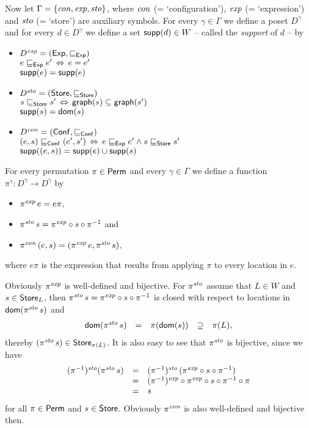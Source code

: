 \documentclass[12pt,a4paper]{report}
\newcommand{\Conf}{\sstyle{Conf}}
\newcommand{\scon}{\nstyle{con}}
\newcommand{\sexp}{\nstyle{exp}}
\newcommand{\ssto}{\nstyle{sto}}
\begin{document}
Now let $\Gamma = \{\scon,\sexp,\ssto\}$, where $\scon$ (= `configuration'),
$\sexp$ (= `expression') and $\ssto$ (= `store') are auxiliary symbols. For
every $\gamma \in \Gamma$ we define a poset $D^\gamma$ and for every $d \in D^\gamma$
we define a set $\mathsf{supp}(d) \in W$ -- called the {\em support} of $d$ -- by
\begin{itemize}
  \item $D^\sexp = (\Exp,\sqsubseteq_\Exp)$ \\
        $e \sqsubseteq_{\mathsf{Exp}} e' \,\Leftrightarrow\, e = e'$ \\
        $\mathsf{supp}(e) = \mathsf{supp}(e)$
  \item $D^\ssto = (\Store,\sqsubseteq_\Store)$ \\
        $s \sqsubseteq_{\mathsf{Store}} s' \,\Leftrightarrow\, \mathsf{graph}(s) \subseteq \mathsf{graph}(s')$ \\
        $\mathsf{supp}(s) = \mathsf{dom}(s)$
  \item $D^\scon = (\Conf,\sqsubseteq_\Conf)$ \\
        $(e,s) \sqsubseteq_\Conf (e',s') \,\Leftrightarrow\, e \sqsubseteq_\Exp e' \wedge s \sqsubseteq_\Store s'$ \\
        $\mathsf{supp}((e,s)) = \mathsf{supp}(e) \cup \mathsf{supp}(s)$
\end{itemize}
For every permutation $\pi \in \mathsf{Perm}$ and every $\gamma\in\Gamma$ we define
a function $\pi^\gamma:D^\gamma \to D^\gamma$ by
\begin{itemize}
  \item $\pi^\sexp\,e = e\pi$,
  \item $\pi^\ssto\,s = \pi^\sexp \circ s \circ \pi^{-1}$ and
  \item $\pi^\scon\,(e,s) = (\pi^\sexp\,e,\pi^\ssto\,s)$,
\end{itemize}
where $e\pi$ is the expression that results from applying $\pi$ to every location in $e$.

Obviously $\pi^\sexp$ is well-defined and bijective. For $\pi^\ssto$ assume that $L \in W$ and $s\in\mathsf{Store}_L$,
then $\pi^\ssto\,s = \pi^\sexp \circ s \circ \pi^{-1}$ is closed with respect to locations in
$\dom{\pi^\ssto\,s}$ and
\[\begin{array}{rccccl}
  \dom{\pi^\ssto\,s} &=& \pi(\dom{s}) &\supseteq& \pi(L),
\end{array}\]
thereby $(\pi^\ssto\,s) \in \Store_{\pi(L)}$. It is also easy to see that $\pi^\ssto$ is bijective, since
we have
\[\begin{array}{rcl}
  (\pi^{-1})^\ssto(\pi^\ssto\,s)
  &=& (\pi^{-1})^\ssto\,(\pi^\sexp \circ s \circ \pi^{-1}) \\
  &=& (\pi^{-1})^\sexp \circ \pi^\sexp \circ s \circ \pi^{-1} \circ \pi \\
  &=& s
\end{array}\]
for all $\pi\in\mathsf{Perm}$ and $s\in\mathsf{Store}$. Obviously $\pi^\scon$ is also well-defined and bijective then.
\end{document}
